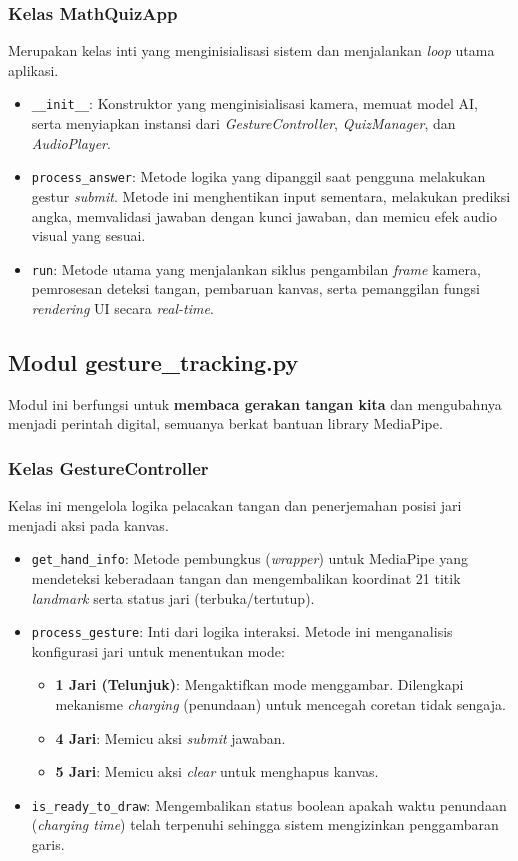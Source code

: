 \subsubsection{Kelas MathQuizApp}
Merupakan kelas inti yang menginisialisasi sistem dan menjalankan \textit{loop} utama aplikasi.
\begin{itemize}
    \item \texttt{\_\_init\_\_}: Konstruktor yang menginisialisasi kamera, memuat model AI, serta menyiapkan instansi dari \textit{GestureController}, \textit{QuizManager}, dan \textit{AudioPlayer}.
    \item \texttt{process\_answer}: Metode logika yang dipanggil saat pengguna melakukan gestur \textit{submit}. Metode ini menghentikan input sementara, melakukan prediksi angka, memvalidasi jawaban dengan kunci jawaban, dan memicu efek audio visual yang sesuai.
    \item \texttt{run}: Metode utama yang menjalankan siklus pengambilan \textit{frame} kamera, pemrosesan deteksi tangan, pembaruan kanvas, serta pemanggilan fungsi \textit{rendering} UI secara \textit{real-time}.
\end{itemize}

\subsection{Modul gesture\_tracking.py}
Modul ini berfungsi untuk \textbf{membaca gerakan tangan kita} dan mengubahnya menjadi perintah digital, semuanya berkat bantuan library MediaPipe.

\subsubsection{Kelas GestureController}
Kelas ini mengelola logika pelacakan tangan dan penerjemahan posisi jari menjadi aksi pada kanvas.
\begin{itemize}
    \item \texttt{get\_hand\_info}: Metode pembungkus (\textit{wrapper}) untuk MediaPipe yang mendeteksi keberadaan tangan dan mengembalikan koordinat 21 titik \textit{landmark} serta status jari (terbuka/tertutup).
    \item \texttt{process\_gesture}: Inti dari logika interaksi. Metode ini menganalisis konfigurasi jari untuk menentukan mode:
    \begin{itemize}
        \item \textbf{1 Jari (Telunjuk)}: Mengaktifkan mode menggambar. Dilengkapi mekanisme \textit{charging} (penundaan) untuk mencegah coretan tidak sengaja.
        \item \textbf{4 Jari}: Memicu aksi \textit{submit} jawaban.
        \item \textbf{5 Jari}: Memicu aksi \textit{clear} untuk menghapus kanvas.
    \end{itemize}
    \item \texttt{is\_ready\_to\_draw}: Mengembalikan status boolean apakah waktu penundaan (\textit{charging time}) telah terpenuhi sehingga sistem mengizinkan penggambaran garis.
\end{itemize}

